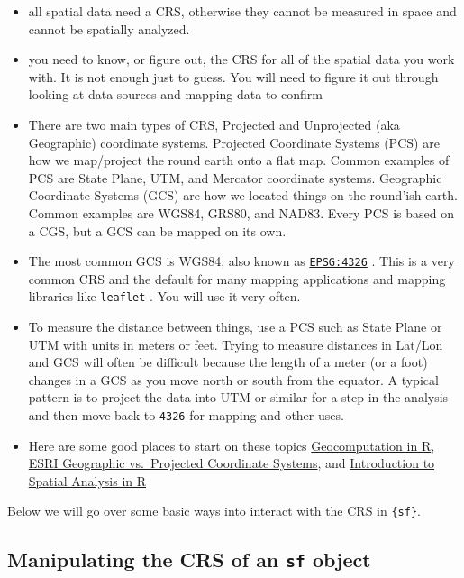 \documentclass[
]{article}
\begin{document}
\begin{itemize}
\item
  all spatial data need a CRS, otherwise they cannot be measured in
  space and cannot be spatially analyzed.
\item
  you need to know, or figure out, the CRS for all of the spatial data
  you work with. It is not enough just to guess. You will need to figure
  it out through looking at data sources and mapping data to confirm
\item
  There are two main types of CRS, Projected and Unprojected (aka
  Geographic) coordinate systems. Projected Coordinate Systems (PCS) are
  how we map/project the round earth onto a flat map. Common examples of
  PCS are State Plane, UTM, and Mercator coordinate systems. Geographic
  Coordinate Systems (GCS) are how we located things on the round'ish
  earth. Common examples are WGS84, GRS80, and NAD83. Every PCS is based
  on a CGS, but a GCS can be mapped on its own.
\item
  The most common GCS is WGS84, also known as
  \href{https://epsg.io/4326}{\texttt{EPSG:4326}} . This is a very
  common CRS and the default for many mapping applications and mapping
  libraries like \texttt{leaflet} . You will use it very often.
\item
  To measure the distance between things, use a PCS such as State Plane
  or UTM with units in meters or feet. Trying to measure distances in
  Lat/Lon and GCS will often be difficult because the length of a meter
  (or a foot) changes in a GCS as you move north or south from the
  equator. A typical pattern is to project the data into UTM or similar
  for a step in the analysis and then move back to \texttt{4326} for
  mapping and other uses.
\item
  Here are some good places to start on these topics
  \href{https://geocompr.robinlovelace.net/reproj-geo-data.html\#introduction-3}{Geocomputation
  in R},
  \href{https://www.esri.com/arcgis-blog/products/arcgis-pro/mapping/gcs_vs_pcs/}{ESRI
  Geographic vs.~Projected Coordinate Systems}, and
  \href{https://mgimond.github.io/Spatial/chp09_0.html}{Introduction to
  Spatial Analysis in R}
\end{itemize}

Below we will go over some basic ways into interact with the CRS in
\texttt{\{sf\}}.

\hypertarget{manipulating-the-crs-of-an-sf-object}{%
\subsection{\texorpdfstring{Manipulating the CRS of an \texttt{sf}
object}{Manipulating the CRS of an sf object}}\label{manipulating-the-crs-of-an-sf-object}}
\end{document}
